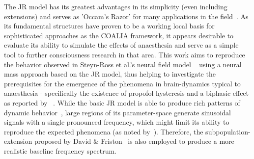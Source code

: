 The JR model has its greatest advantages in its simplicity (even including extensions) and serves as 'Occam's Razor'
for many applications in the field~\cite{kuhlmann_neural_2016}.
As its fundamental structures have proven to be a working local basis for sophisticated approaches as the COALIA
framework,
it appears desirable to evaluate its ability to simulate the effects of anaesthesia and serve as a simple tool to
further consciousness research in that area.
This work aims to reproduce the behavior observed in Steyn-Ross et al.'s neural field model ~\cite{hutt_progress_2011}
using a neural mass approach based on the JR model,
thus helping to investigate the prerequisites for the emergence of the phenomena in brain-dynamics typical to
anaesthesia -
specifically the existence of propofol hysteresis and a biphasic effect as reported by ~\cite{hutt_progress_2011}.
While the basic JR model is able to produce rich patterns of dynamic behavior~\cite{spiegler_bifurcation_2010},
large regions of its parameter-space generate sinusoidal signals with a single pronounced frequency,
which might limit its ability to reproduce the expected phenomena (as noted by~\cite{kuhlmann_neural_2016}).
Therefore, the subpopulation-extension proposed by David \& Friston~\cite{david_neural_2003} is also employed to
produce a more realistic baseline frequency spectrum.



%

%
%


